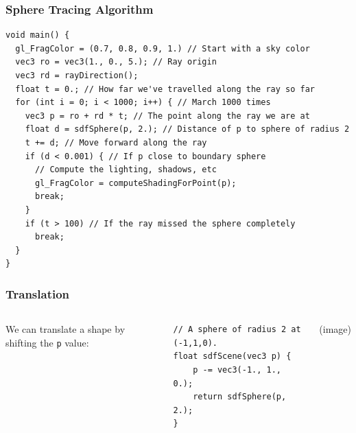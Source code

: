 \documentclass{beamer}
\begin{document}
\begin{frame}[fragile]
    \frametitle{Sphere Tracing Algorithm}
    \begin{verbatim}
void main() {
  gl_FragColor = (0.7, 0.8, 0.9, 1.) // Start with a sky color
  vec3 ro = vec3(1., 0., 5.); // Ray origin
  vec3 rd = rayDirection();
  float t = 0.; // How far we've travelled along the ray so far
  for (int i = 0; i < 1000; i++) { // March 1000 times
    vec3 p = ro + rd * t; // The point along the ray we are at
    float d = sdfSphere(p, 2.); // Distance of p to sphere of radius 2
    t += d; // Move forward along the ray
    if (d < 0.001) { // If p close to boundary sphere
      // Compute the lighting, shadows, etc
      gl_FragColor = computeShadingForPoint(p);
      break;
    }
    if (t > 100) // If the ray missed the sphere completely
      break;
  }
}
    \end{verbatim}
\end{frame}

\begin{frame}[fragile]
    \frametitle{Translation}
    \begin{columns}
        We can translate a shape by shifting the \texttt{p} value:

        \begin{verbatim}
// A sphere of radius 2 at (-1,1,0).
float sdfScene(vec3 p) {
    p -= vec3(-1., 1., 0.);
    return sdfSphere(p, 2.);
}
        \end{verbatim}
        (image)
    \end{columns}
\end{frame}
\end{document}
